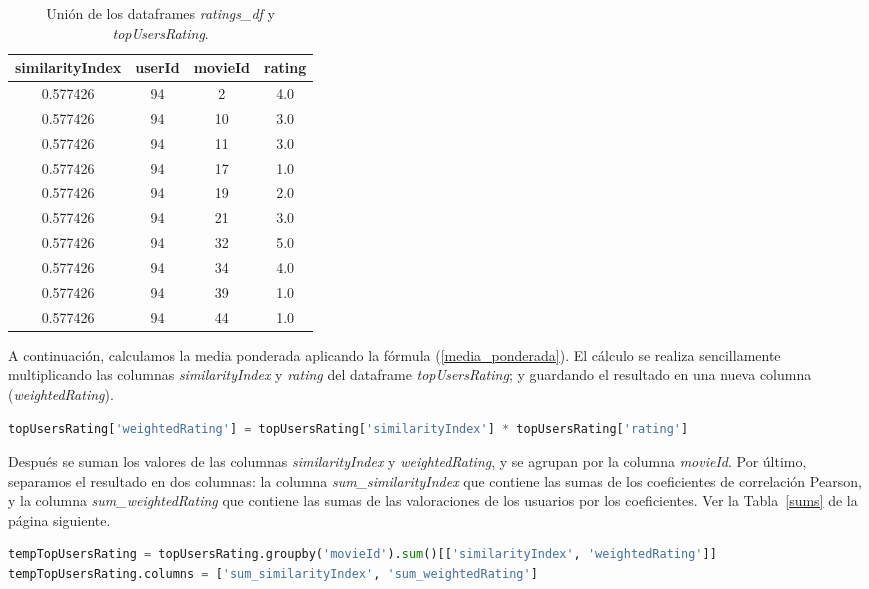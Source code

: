 \documentclass{uimppracticas}
\begin{document}
\begin{table}[H]
	\centering
	\begin{tabular}{cccc}
		\toprule
		similarityIndex &  userId &  movieId &  rating \\
		\midrule
		0.577426 &      94 &        2 &     4.0 \\
		0.577426 &      94 &       10 &     3.0 \\
		0.577426 &      94 &       11 &     3.0 \\
		0.577426 &      94 &       17 &     1.0 \\
		0.577426 &      94 &       19 &     2.0 \\
		0.577426 &      94 &       21 &     3.0 \\
		0.577426 &      94 &       32 &     5.0 \\
		0.577426 &      94 &       34 &     4.0 \\
		0.577426 &      94 &       39 &     1.0 \\
		0.577426 &      94 &       44 &     1.0 \\
		\bottomrule
	\end{tabular}
	\caption{Unión de los dataframes \textit{ratings\_df} y \textit{topUsersRating}.}
	\label{ratings_similares}
\end{table}

A continuación, calculamos la media ponderada aplicando la fórmula (\ref{media_ponderada}). El cálculo se realiza sencillamente multiplicando las columnas \textit{similarityIndex} y \textit{rating} del dataframe \textit{topUsersRating}; y guardando el resultado en una nueva columna (\textit{weightedRating}). 

\begin{lstlisting}[language=python, basicstyle=\footnotesize, belowskip=-0.5 \baselineskip]
topUsersRating['weightedRating'] = topUsersRating['similarityIndex'] * topUsersRating['rating']
\end{lstlisting} 

Después se suman los valores de las columnas \textit{similarityIndex} y \textit{weightedRating}, y se agrupan por la columna \textit{movieId}. Por último, separamos el resultado en dos columnas: la columna \textit{sum\_similarityIndex} que contiene las sumas de los coeficientes de correlación Pearson, y la columna \textit{sum\_weightedRating} que contiene las sumas de las valoraciones de los usuarios por los coeficientes. Ver la Tabla~\ref{sums} de la página siguiente.

\begin{lstlisting}[language=python, basicstyle=\footnotesize]
tempTopUsersRating = topUsersRating.groupby('movieId').sum()[['similarityIndex', 'weightedRating']]
tempTopUsersRating.columns = ['sum_similarityIndex', 'sum_weightedRating']
\end{lstlisting} 
\end{document}
